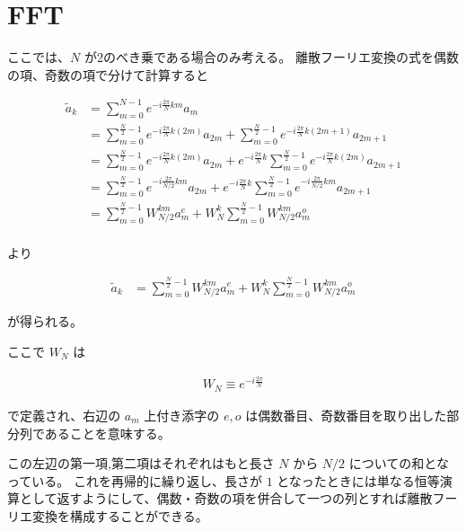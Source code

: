 \section{FFT}

ここでは、$N$ が2のべき乗である場合のみ考える。
離散フーリエ変換の式を偶数の項、奇数の項で分けて計算すると

\begin{align*}
    \tilde{a}_k &= \sum_{m = 0}^{N - 1} e^{-i\frac{2\pi}{N} km} a_m \\
                &= \sum_{m = 0}^{\frac{N}{2} - 1} e^{-i\frac{2\pi}{N} k(2m)} a_{2m} 
                   + \sum_{m = 0}^{\frac{N}{2} - 1} e^{-i\frac{2\pi}{N} k(2m + 1)} a_{2m + 1} \\ 
                &= \sum_{m = 0}^{\frac{N}{2} - 1} e^{-i\frac{2\pi}{N} k(2m)} a_{2m} 
                   + e^{-i\frac{2\pi}{N}k} \sum_{m = 0}^{\frac{N}{2} - 1} e^{-i\frac{2\pi}{N} k(2m)} a_{2m + 1} \\ 
                &= \sum_{m = 0}^{\frac{N}{2} - 1} e^{-i\frac{2\pi}{N/2} km} a_{2m} 
                   + e^{-i\frac{2\pi}{N}k} \sum_{m = 0}^{\frac{N}{2} - 1} e^{-i\frac{2\pi}{N/2} km} a_{2m + 1} \\ 
                &= \sum_{m = 0}^{\frac{N}{2} - 1} W_{N/2}^{km} a^{e}_{m} 
            + W_N^{k} \sum_{m = 0}^{\frac{N}{2} - 1} W_{N/2}^{km} a^{o}_{m} \\ 
\end{align*}

より

\begin{align}\label{merge_1}
    \tilde{a}_k &= \sum_{m = 0}^{\frac{N}{2} - 1} W_{N/2}^{km} a^{e}_{m} 
            + W_N^{k} \sum_{m = 0}^{\frac{N}{2} - 1} W_{N/2}^{km} a^{o}_{m} 
\end{align}

が得られる。

ここで $W_N$ は

\begin{align*}
    W_N \equiv e^{-i\frac{2\pi}{N}} 
\end{align*}

で定義され、右辺の $a_m$ 上付き添字の $e,o$ は偶数番目、奇数番目を取り出した部分列であることを意味する。

この左辺の第一項,第二項はそれぞれはもと長さ $N$ から $N/2$ についての和となっている。
これを再帰的に繰り返し、長さが $1$ となったときには単なる恒等演算として返すようにして、偶数・奇数の項を併合して一つの列とすれば離散フーリエ変換を構成することができる。

